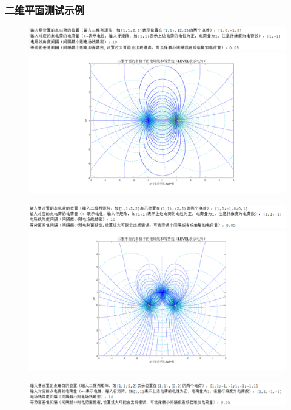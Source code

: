 \documentclass[UTF8]{article}
\numberwithin{figure}{subsection}
\numberwithin{table}{subsection}
\begin{document}
\begin{multicols}{2}
	\subsubsection{二维平面测试示例}
	\begin{figure}[H]
		\centering
		\includegraphics[scale=0.4]{ceshi1.png}
		\includegraphics[scale=0.15]{测试1.png}
	\end{figure}
	\begin{figure}[H]
		\centering
		\includegraphics[scale=0.4]{ceshi2.png}
	\includegraphics[scale=0.15]{测试2.png}
	\end{figure}
	\begin{figure}[H]
		\centering
		\includegraphics[scale=0.4]{ceshi3.png}

\end{figure}
\end{multicols}
\end{document}
